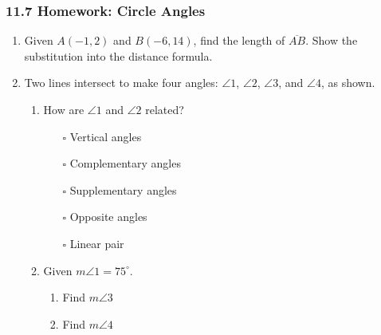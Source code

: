 

\fancyhead[LE]{\thepage}



\subsubsection*{11.7 Homework: Circle Angles}
\begin{enumerate}
\item Given $A(-1,2)$ and $B(-6,14)$, find the length of $\overline{AB}$. Show the substitution into the distance formula.

\item Two lines intersect to make four angles: $\angle 1$, $\angle 2$, $\angle 3$, and $\angle 4$, as shown.
  \begin{multicols}{2}  
    \begin{enumerate}
      \item How are $\angle 1$ and $\angle 2$ related?
        \begin{itemize}
          \item[$\square$] Vertical angles
          \item[$\square$] Complementary angles
          \item[$\square$] Supplementary angles
          \item[$\square$] Opposite angles
          \item[$\square$] Linear pair
        \end{itemize}
      \item Given $m\angle 1 = 75^\circ$.
        \begin{enumerate}
          \item Find $m\angle 3$ \vspace{0.5cm}
          \item Find $m\angle 4$ \vspace{2cm}
        \end{enumerate} 
        \end{enumerate}
  \end{multicols}
  

\end{enumerate}
